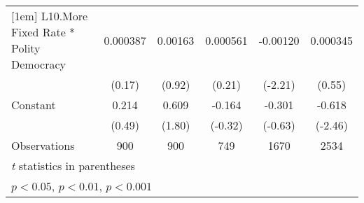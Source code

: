 {\begin{longtable}{l*{5}{c}}
[1em]
L10.More Fixed Rate * Polity Democracy& 0.000387         &  0.00163         & 0.000561         & -0.00120\sym{*}  & 0.000345         \\
                &   (0.17)         &   (0.92)         &   (0.21)         &  (-2.21)         &   (0.55)         \\
[1em]
Constant        &    0.214         &    0.609         &   -0.164         &   -0.301         &   -0.618\sym{*}  \\
                &   (0.49)         &   (1.80)         &  (-0.32)         &  (-0.63)         &  (-2.46)         \\
\hline
Observations    &      900         &      900         &      749         &     1670         &     2534         \\
\hline\hline
\multicolumn{6}{l}{\footnotesize \textit{t} statistics in parentheses}\\
\multicolumn{6}{l}{\footnotesize \sym{*} \(p<0.05\), \sym{**} \(p<0.01\), \sym{***} \(p<0.001\)}\\
\end{longtable}
}
